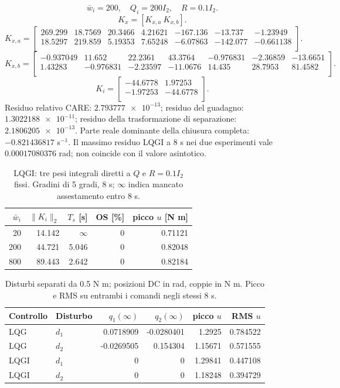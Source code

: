 \[\bar w_i=200,\quad Q_i=200 I_2,\quad R=0.1 I_2.\]
\[K_x=[K_{x,a}\ K_{x,b}].\]
{\small
\[K_{x,a}=\begin{bmatrix}
269.299 & 18.7569 & 20.3466 & 4.21621 & -167.136 & -13.737 & -1.23949 \\
18.5297 & 219.859 & 5.19353 & 7.65248 & -6.07863 & -142.077 & -0.661138 \\
\end{bmatrix}.\]
\[K_{x,b}=\begin{bmatrix}
-0.937049 & 11.652 & 22.2361 & 43.3764 & -0.976831 & -2.36859 & -13.6651 \\
1.43283 & -0.976831 & -2.23597 & -11.0676 & 14.435 & 28.7953 & 81.4582 \\
\end{bmatrix}.\]
\[K_i=\begin{bmatrix}
-44.6778 & 1.97253 \\
-1.97253 & -44.6778 \\
\end{bmatrix}.\]
}
Residuo relativo CARE: $\num{2.793777e-13}$; residuo del guadagno: $\num{1.3022188e-11}$; residuo della trasformazione di separazione: $\num{2.1806205e-13}$.
Parte reale dominante della chiusura completa: $\num{-0.821436817}$ s$^{-1}$.
Il massimo residuo LQGI a 8 s nei due esperimenti vale $\num{0.00017080376}$ rad; non coincide con il valore asintotico.\par
\begin{table}[htbp]\centering\small
\begin{tabular}{rrrrr}\toprule
$\bar w_i$ & $\|K_i\|_2$ & $T_s$ [s] & OS [\%] & picco $u$ [N m] \\
\midrule
20 & 14.142 & $\infty$ & 0 & 0.71121 \\
200 & 44.721 & 5.046 & 0 & 0.82048 \\
800 & 89.443 & 2.642 & 0 & 0.82184 \\
\bottomrule\end{tabular}\caption{LQGI: tre pesi integrali diretti a $Q$ e $R=0.1 I_2$ fissi. Gradini di 5 gradi, 8 s; $\infty$ indica mancato assestamento entro 8 s.}\label{tab:lqgi-wi}\end{table}
\begin{table}[htbp]\centering\small
\begin{tabular}{llrrrr}\toprule
Controllo & Disturbo & $q_1(\infty)$ & $q_2(\infty)$ & picco $u$ & RMS $u$ \\
\midrule
LQG & $d_1$ & 0.0718909 & -0.0280401 & 1.2925 & 0.784522 \\
LQG & $d_2$ & -0.0269505 & 0.154304 & 1.15671 & 0.571555 \\
LQGI & $d_1$ & 0 & 0 & 1.29841 & 0.447108 \\
LQGI & $d_2$ & 0 & 0 & 1.18248 & 0.394729 \\
\bottomrule\end{tabular}\caption{Disturbi separati da 0.5 N m; posizioni DC in rad, coppie in N m. Picco e RMS su entrambi i comandi negli stessi 8 s.}\label{tab:lqgi-disturbi}\end{table}
